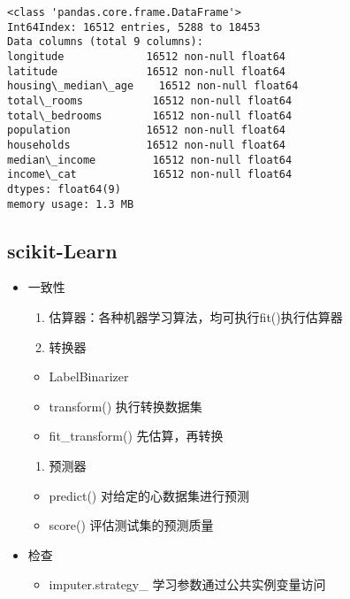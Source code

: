 \documentclass[11pt]{article}
\providecommand{\tightlist}{%
      \setlength{\itemsep}{0pt}\setlength{\parskip}{0pt}}
\begin{document}
    \begin{Verbatim}[commandchars=\\\{\}]
<class 'pandas.core.frame.DataFrame'>
Int64Index: 16512 entries, 5288 to 18453
Data columns (total 9 columns):
longitude             16512 non-null float64
latitude              16512 non-null float64
housing\_median\_age    16512 non-null float64
total\_rooms           16512 non-null float64
total\_bedrooms        16512 non-null float64
population            16512 non-null float64
households            16512 non-null float64
median\_income         16512 non-null float64
income\_cat            16512 non-null float64
dtypes: float64(9)
memory usage: 1.3 MB
    \end{Verbatim}

    \hypertarget{scikit-learn}{%
\subsection{scikit-Learn}\label{scikit-learn}}

\begin{itemize}
\tightlist
\item
  一致性

  \begin{enumerate}
  \def\labelenumi{\arabic{enumi}.}
  \tightlist
  \item
    估算器：各种机器学习算法，均可执行fit()执行估算器
  \item
    转换器
  \end{enumerate}

  \begin{itemize}
  \tightlist
  \item
    LabelBinarizer
  \item
    transform() 执行转换数据集
  \item
    fit\_transform() 先估算，再转换
  \end{itemize}

  \begin{enumerate}
  \def\labelenumi{\arabic{enumi}.}
  \setcounter{enumi}{2}
  \tightlist
  \item
    预测器
  \end{enumerate}

  \begin{itemize}
  \tightlist
  \item
    predict() 对给定的心数据集进行预测
  \item
    score() 评估测试集的预测质量
  \end{itemize}
\item
  检查

  \begin{itemize}
  \tightlist
  \item
    imputer.strategy\_ 学习参数通过公共实例变量访问
  \end{itemize}
\end{itemize}
\end{document}
